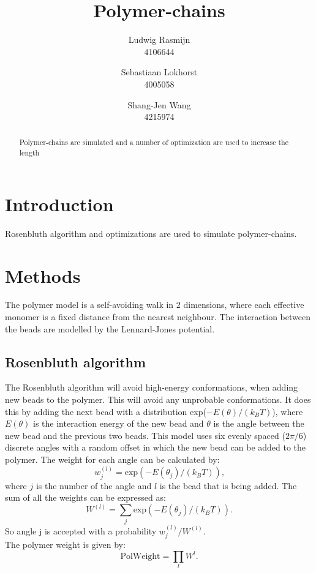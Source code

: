 \documentclass[a4paper,twocolumn]{article}
\begin{document}
\title{Polymer-chains}
\date{}
\author{Ludwig Rasmijn\\ 4106644 \and Sebastiaan Lokhorst\\ 4005058 \and Shang-Jen Wang\\ 4215974}
\maketitle

\begin{abstract}
    Polymer-chains are simulated and a number of optimization are used to increase the length
\end{abstract}

\section{Introduction}
Rosenbluth algorithm and optimizations are used to simulate polymer-chains. 
 
\section{Methods}
The polymer model is a self-avoiding walk in 2 dimensions, where each effective monomer is a fixed distance from the nearest neighbour. The interaction between the beads are modelled by the Lennard-Jones potential.
\subsection{Rosenbluth algorithm}
The Rosenbluth algorithm will avoid high-energy conformations, when adding new beads to the polymer. This will avoid any unprobable conformations. It does this by adding the next bead with a distribution exp($-E(\theta)/(k_BT)$), where $E(\theta)$ is the interaction energy of the new bead and $\theta$ is the angle between the new bead and the previous two beads. This model uses six evenly spaced ($2\pi /6$) discrete angles with a random offset in which the new bead can be added to the polymer. The weight for each angle can be calculated by:
\begin{equation}\label{eq:weight}
    w_j^{(l)}=\text{exp}(-E(\theta_j)/(k_BT))\text{,}
\end{equation}\label{eq:sumweight}
where $j$ is the number of the angle and $l$ is the bead that is being added. The sum of all the weights can be expressed as:
\begin{equation}
    W^{(l)}=\sum_j \text{exp}(-E(\theta_j)/(k_BT))\text{.}
\end{equation}
So angle j is accepted with a probability $w_j^{(l)}/W^{(l)}$.\\
The polymer weight is given by:
\begin{equation}\label{eq:polweight}
    \text{PolWeight}=\prod_l W^l\text{.}
\end{equation}
\end{document}

